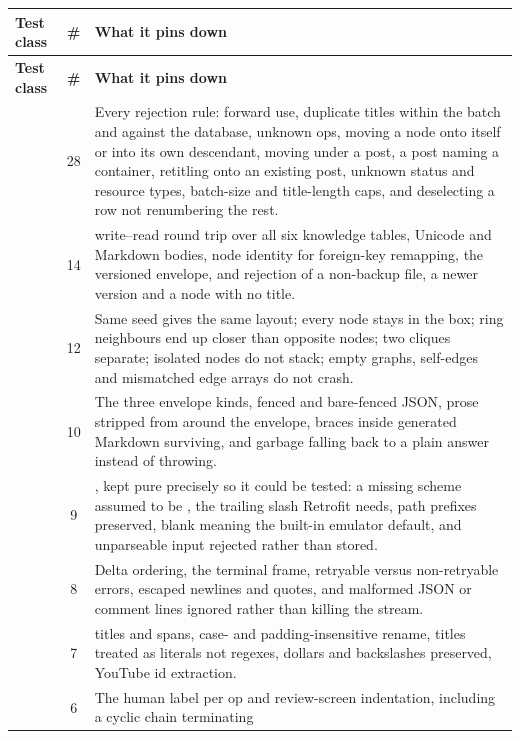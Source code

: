 \begin{xltabular}{\linewidth}{L{4.2cm} c X}
\toprule
\textbf{Test class} & \textbf{\#} & \textbf{What it pins down} \\
\midrule
\endfirsthead
\toprule
\textbf{Test class} & \textbf{\#} & \textbf{What it pins down} \\
\midrule
\endhead
{} & 28 &
Every rejection rule: forward  use, duplicate titles within the batch and against the
database, unknown ops, moving a node onto itself or into its own descendant, moving under a post, a
post  naming a container, retitling onto an existing post, unknown status and resource
types, batch-size and title-length caps, and deselecting a row not renumbering the rest. \\
 & 14 &
 write--read round trip over all six knowledge tables, Unicode and Markdown bodies,
node identity for foreign-key remapping, the versioned envelope, and rejection of a non-backup file, a
newer version and a node with no title. \\
 & 12 &
Same seed gives the same layout; every node stays in the box; ring neighbours end up closer than
opposite nodes; two cliques separate; isolated nodes do not stack; empty graphs, self-edges and
mismatched edge arrays do not crash. \\
 & 10 &
The three envelope kinds, fenced and bare-fenced JSON, prose stripped from around the envelope, braces
inside generated Markdown surviving, and garbage falling back to a plain answer instead of throwing. \\
 & 9 &
, kept pure precisely so it could be tested: a missing scheme assumed to be
, the trailing slash Retrofit needs, path prefixes preserved, blank meaning the built-in
emulator default, and unparseable input rejected rather than stored. \\
 & 8 &
Delta ordering, the terminal frame, retryable versus non-retryable errors, escaped newlines and
quotes, and malformed JSON or comment lines ignored rather than killing the stream. \\
 & 7 &
 titles and spans, case- and padding-insensitive rename, titles treated as
literals not regexes, dollars and backslashes preserved, YouTube id extraction. \\
 & 6 &
The human label per op and review-screen indentation, including a cyclic  chain terminating

\end{xltabular}
